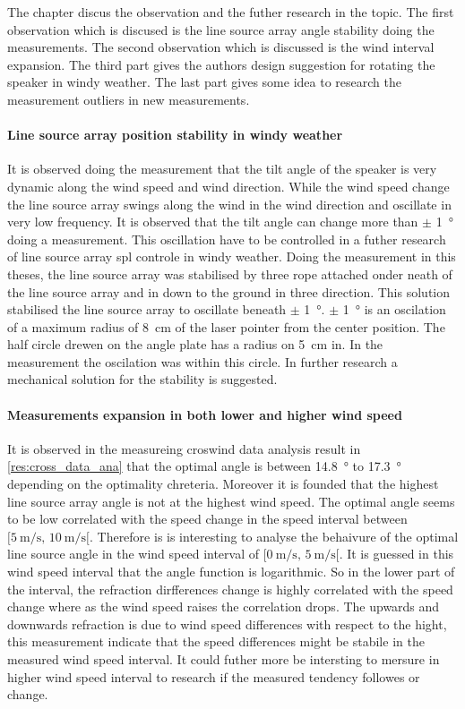 
The chapter discus the observation and the futher research in the topic. The first observation which is discused is the line source array angle stability doing the measurements. The second observation which is discussed is the wind interval expansion. The third part gives the authors design suggestion for rotating the speaker in windy weather. The last part gives some idea to research the measurement outliers in new measurements.


\paragraph{Line source array position stability in windy weather} 
It is observed doing the measurement that the tilt angle of the speaker is very dynamic along the wind speed and wind direction. While the wind speed change the line source array swings along the wind in the wind direction and oscillate in very low frequency. It is observed that the tilt angle can change more than $\pm$ \SI{1}{\degree} doing a measurement. This oscillation have to be controlled in a futher research of line source array \gls{spl} controle in windy weather. Doing the measurement in this theses, the line source array was stabilised by three rope attached onder neath of the line source array and in down to the ground in three direction. This solution stabilised the line source array to oscillate beneath  $\pm$ \SI{1}{\degree}. $\pm$ \SI{1}{\degree} is an oscilation of a maximum radius of \SI{8}{\centi\meter} of the laser pointer from the center position. The half circle drewen on the angle plate has a radius on \SI{5}{\centi\meter} in. In the measurement the oscilation was within this circle. In further research a mechanical solution for the stability is suggested.


\paragraph{Measurements expansion in both lower and higher wind speed} 
It is observed in the measureing croswind data analysis result in \autoref{res:cross_data_ana} that the optimal angle is between \SI{14.8}{\degree} to \SI{17.3}{\degree} depending on the optimality chreteria. Moreover it is founded that the highest line source array angle is not at the highest wind speed. The optimal angle seems to be low correlated with the speed change in the speed interval between $[\SI{5}{\meter\per\second},\, \SI{10}{\meter\per\second}[ $. Therefore is is interesting to analyse the behaivure of the optimal line source angle in the wind speed interval of $[\SI{0}{\meter\per\second},\, \SI{5}{\meter\per\second}[ $. It is guessed in this wind speed interval that the angle function is logarithmic. So in the lower part of the interval, the refraction dirfferences change is highly correlated with the speed change where as the wind speed raises the correlation drops. The upwards and downwards refraction is due to wind speed differences with respect to the hight, this measurement indicate that the speed differences might be stabile in the measured wind speed interval. It could futher more be intersting to mersure in higher wind speed interval to research if the measured tendency followes or change. 



